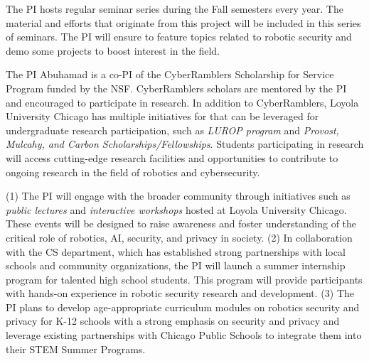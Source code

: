  The PI hosts regular seminar series during the Fall semesters every year.
The material and efforts that originate from this project will be included in this series of seminars. The PI will ensure to feature topics related to robotic security and demo some projects to boost interest in the field.

The PI Abuhamad is a co-PI of the CyberRamblers Scholarship for Service Program funded by the NSF. CyberRamblers scholars are mentored by the PI and encouraged to participate in research.
In addition to CyberRamblers, Loyola University Chicago has multiple initiatives for that can be leveraged for undergraduate research participation, such as \emph{LUROP program} and \emph{Provost, Mulcahy, and Carbon Scholarships/Fellowships}.
Students participating in research will access cutting-edge research facilities and opportunities to contribute to ongoing research in the field of robotics and cybersecurity.





(1) The PI will engage with the broader community through initiatives such as \emph{public lectures} and \emph{interactive workshops} hosted at Loyola University Chicago. These events will be designed to raise awareness and foster understanding of the critical role of robotics, AI, security, and privacy in  society. 
(2) In collaboration with the CS department, which has established strong partnerships with local schools and community organizations, the PI will launch a summer internship program for talented high school students. This program will provide participants with hands-on experience in robotic security research and development. 
(3) The PI plans to develop age-appropriate curriculum modules on robotics security and privacy for K-12 schools with a strong emphasis on security and privacy and leverage existing partnerships with Chicago Public Schools to integrate them into their STEM Summer Programs.


